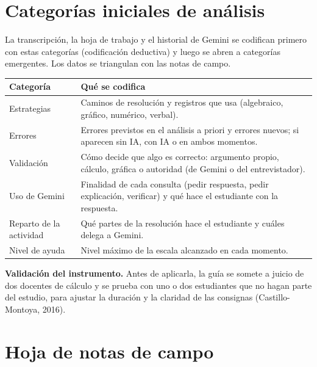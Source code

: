 \documentclass[11pt,letterpaper]{article}
\begin{document}
\section{Categorías iniciales de análisis}

La transcripción, la hoja de trabajo y el historial de Gemini se codifican primero con estas categorías (codificación deductiva) y luego se abren a categorías emergentes. Los datos se triangulan con las notas de campo.

\begin{center}
\small
\renewcommand{\arraystretch}{1.3}
\begin{tabularx}{\linewidth}{@{}p{3.4cm}L@{}}
\toprule
\textbf{Categoría} & \textbf{Qué se codifica}\\
\midrule
Estrategias & Caminos de resolución y registros que usa (algebraico, gráfico, numérico, verbal).\\
Errores & Errores previstos en el análisis a priori y errores nuevos; si aparecen sin IA, con IA o en ambos momentos.\\
Validación & Cómo decide que algo es correcto: argumento propio, cálculo, gráfica o autoridad (de Gemini o del entrevistador).\\
Uso de Gemini & Finalidad de cada consulta (pedir respuesta, pedir explicación, verificar) y qué hace el estudiante con la respuesta.\\
Reparto de la actividad & Qué partes de la resolución hace el estudiante y cuáles delega a Gemini.\\
Nivel de ayuda & Nivel máximo de la escala alcanzado en cada momento.\\
\bottomrule
\end{tabularx}
\end{center}

\noindent\textbf{Validación del instrumento.} Antes de aplicarla, la guía se somete a juicio de dos docentes de cálculo y se prueba con uno o dos estudiantes que no hagan parte del estudio, para ajustar la duración y la claridad de las consignas (Castillo-Montoya, 2016).

\section{Hoja de notas de campo}\label{sec:notas}
\end{document}
